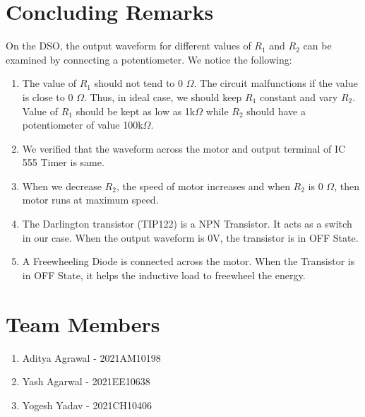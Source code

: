 \documentclass{article}
\begin{document}
\section{Concluding Remarks}
On the DSO, the output waveform for different values of $R_{1}$ and $R_2$ can be examined by connecting a potentiometer. We notice the following:
\begin{enumerate}
\item The value of $R_1$ should not tend to 0 $\Omega$. The circuit malfunctions if the value is close to 0 $\Omega$. Thus, in ideal case, we should keep $R_{1}$ constant and vary $R_2$. Value of $R_1$ should be kept as low as 1k$\Omega$ while $R_2$ should have a potentiometer of value 100k$\Omega$.
\item We verified that the waveform across the motor and output terminal of IC 555 Timer is same.
\item When we decrease $R_2$, the speed of motor increases and when $R_2$ is 0 $\Omega$, then motor runs at maximum speed.
\item The Darlington transistor (TIP122) is a NPN Transistor. It acts as a switch in our case. When the output waveform is 0V, the transistor is in OFF State.
\item A Freewheeling Diode is connected across the motor. When the Transistor
is in OFF State, it helps the inductive load to freewheel the energy.
\end{enumerate}
\section{Team Members}
\begin{enumerate}
    \item Aditya Agrawal - 2021AM10198
    \item Yash Agarwal - 2021EE10638
    \item Yogesh Yadav - 2021CH10406
\end{enumerate}
\end{document}
